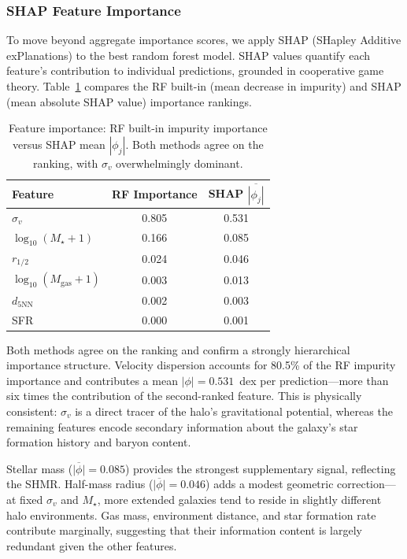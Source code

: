 \documentclass[12pt, a4paper]{article}
\newcommand{\sigmav}{\sigma_v}
\newcommand{\Mstar}{M_\star}
\begin{document}
\subsubsection{SHAP Feature Importance}
\label{sec:shap}

To move beyond aggregate importance scores, we apply SHAP (SHapley Additive exPlanations) to the best random forest model.  SHAP values quantify each feature's contribution to individual predictions, grounded in cooperative game theory.  Table~\ref{tab:importance} compares the RF built-in (mean decrease in impurity) and SHAP (mean absolute SHAP value) importance rankings.

\begin{table}[H]
  \centering
  \caption{Feature importance: RF built-in impurity importance versus SHAP mean $|\phi_j|$.  Both methods agree on the ranking, with $\sigmav$ overwhelmingly dominant.}
  \label{tab:importance}
  \begin{tabular}{@{}lcc@{}}
    \toprule
    Feature & RF Importance & SHAP $\overline{|\phi_j|}$ \\
    \midrule
    $\sigmav$                         & 0.805 & 0.531 \\
    $\log_{10}(\Mstar + 1)$           & 0.166 & 0.085 \\
    $r_{1/2}$                         & 0.024 & 0.046 \\
    $\log_{10}(M_\mathrm{gas} + 1)$   & 0.003 & 0.013 \\
    $d_{5\mathrm{NN}}$                & 0.002 & 0.003 \\
    SFR                               & 0.000 & 0.001 \\
    \bottomrule
  \end{tabular}
\end{table}

Both methods agree on the ranking and confirm a strongly hierarchical importance structure.  Velocity dispersion accounts for 80.5\% of the RF impurity importance and contributes a mean $|\phi| = 0.531$~dex per prediction---more than six times the contribution of the second-ranked feature.  This is physically consistent: $\sigmav$ is a direct tracer of the halo's gravitational potential, whereas the remaining features encode secondary information about the galaxy's star formation history and baryon content.

Stellar mass ($\overline{|\phi|} = 0.085$) provides the strongest supplementary signal, reflecting the SHMR.  Half-mass radius ($\overline{|\phi|} = 0.046$) adds a modest geometric correction---at fixed $\sigmav$ and $\Mstar$, more extended galaxies tend to reside in slightly different halo environments.  Gas mass, environment distance, and star formation rate contribute marginally, suggesting that their information content is largely redundant given the other features.
\end{document}
